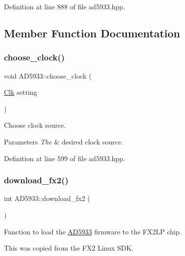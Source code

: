 Definition at line 888 of file ad5933.\+hpp.



\subsection{Member Function Documentation}
\mbox{\label{struct_a_d5933_ac1504cf786233e9802f80aac58a89ef7}} 
\subsubsection{\texorpdfstring{choose\+\_\+clock()}{choose\_clock()}}
{\footnotesize\ttfamily void A\+D5933\+::choose\+\_\+clock (\begin{DoxyParamCaption}\item[{\mbox{\hyperlink{ad5933_8hpp_a252769b931abfc990c5d5396cc352d35}{Clk}}}]{setting }\end{DoxyParamCaption})}



Choose clock source. 


\begin{DoxyParams}{Parameters}
{\em The} & desired clock source. \\
\hline
\end{DoxyParams}


Definition at line 599 of file ad5933.\+hpp.

\mbox{\label{struct_a_d5933_a18b02bd0ab0239c9c96aafac457fb387}} 
\subsubsection{\texorpdfstring{download\+\_\+fx2()}{download\_fx2()}}
{\footnotesize\ttfamily int A\+D5933\+::download\+\_\+fx2 (\begin{DoxyParamCaption}{ }\end{DoxyParamCaption})}



Function to load the \mbox{\hyperlink{struct_a_d5933}{A\+D5933}} firmware to the F\+X2\+LP chip. 

This was copied from the F\+X2 Linux S\+DK. 

